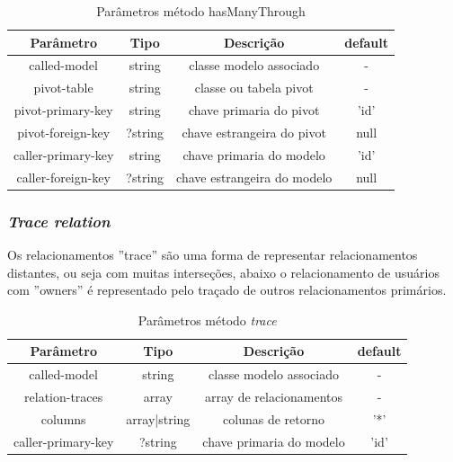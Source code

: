 \begin{table}[H]
\centering
\vspace{0.5cm}
\begin{tabular}{|c|c|c|c|}
\hline  
Parâmetro & Tipo & Descrição & default\\
\hline 
called-model       & string  & classe modelo associado               & -    \\
pivot-table        & string  & classe ou tabela pivot                & -    \\
pivot-primary-key & string  & chave primaria do pivot                & 'id' \\
pivot-foreign-key & ?string & chave estrangeira do pivot             & null \\
caller-primary-key & string  & chave primaria do modelo              & 'id' \\
caller-foreign-key & ?string & chave estrangeira do modelo           & null \\    
\hline
\end{tabular}
\caption{Parâmetros método hasManyThrough}
\end{table}

\spaceH{}

\label{scripts/relation_has_many_through.php}

\subsubsection{\textit{Trace relation}}
\label{sec:trace_relation}

Os relacionamentos ''trace'' são uma forma de representar relacionamentos distantes, ou seja com muitas interseções, abaixo o relacionamento de usuários com ''owners'' é representado pelo traçado de outros relacionamentos primários. 

\begin{table}[ht]
\centering
\vspace{0.5cm}
\begin{tabular}{|c|c|c|c|}
\hline  
Parâmetro & Tipo & Descrição & default\\
\hline 
called-model       & string  & classe modelo associado               & -    \\
relation-traces        & array  & array de relacionamentos           & -    \\
columns          & array|string  & colunas de retorno                 & '*' \\
caller-primary-key & ?string  & chave primaria do modelo              & 'id' \\      
\hline
\end{tabular}
\caption{Parâmetros método \textit{trace}}
\end{table}

